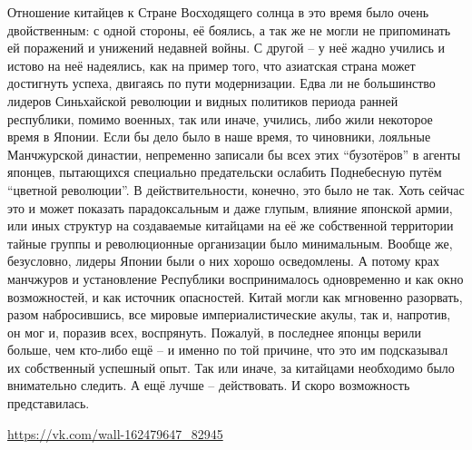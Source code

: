 Отношение китайцев к Стране Восходящего солнца в это время было очень двойственным: с одной стороны, её боялись, а так же не могли не припоминать ей поражений и унижений недавней войны. С другой – у неё жадно учились и истово на неё надеялись, как на пример того, что азиатская страна может достигнуть успеха, двигаясь по пути модернизации. Едва ли не большинство лидеров Синьхайской революции и видных политиков периода ранней республики, помимо военных, так или иначе, учились, либо жили некоторое время в Японии. Если бы дело было в наше время, то чиновники, лояльные Манчжурской династии, непременно записали бы всех этих “бузотёров” в агенты японцев, пытающихся специально предательски ослабить Поднебесную путём “цветной революции”. В действительности, конечно, это было не так. Хоть сейчас это и может показать парадоксальным и даже глупым, влияние японской армии, или иных структур на создаваемые китайцами на её же собственной территории тайные группы и революционные организации было минимальным. Вообще же, безусловно, лидеры Японии были о них хорошо осведомлены. А потому крах манчжуров и установление Республики воспринималось одновременно и как окно возможностей, и как источник опасностей. Китай могли как мгновенно разорвать, разом набросившись, все мировые империалистические акулы, так и, напротив, он мог и, поразив всех, воспрянуть. Пожалуй, в последнее японцы верили больше, чем кто-либо ещё – и именно по той причине, что это им подсказывал их собственный успешный опыт. Так или иначе, за китайцами необходимо было внимательно следить. А ещё лучше – действовать. И скоро возможность представилась. 

\url{https://vk.com/wall-162479647_82945}